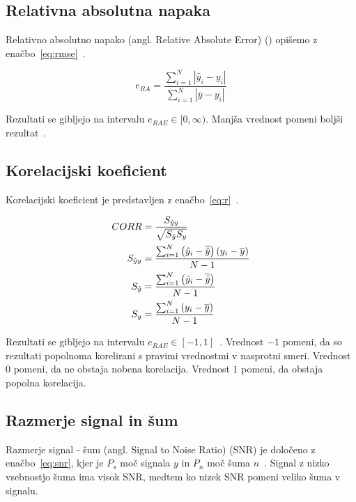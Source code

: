 \subsection{Relativna absolutna napaka}
Relativno absolutno napako (angl. Relative Absolute Error) (\rae) opišemo z enačbo~\eqref{eq:rmse}~\cite{trucco1998introductory}.

\begin{equation}
e_{RA} = \frac{\sum_{i=1}^{N} \left | \hat{y}_i - y_i \right |}{\sum_{i=1}^{N} \left| \overline{y} - y_i \right|}
\label{eq:rae}
\end{equation}

Rezultati se gibljejo na intervalu $e_{RAE} \in [0, \infty)$. Manjša vrednost pomeni boljši rezultat~\cite{witten2005data}.

\subsection{Korelacijski koeficient}
Korelacijski koeficient \corr je predstavljen z enačbo~\eqref{eq:r}~\cite{witten2005data}.

\begin{subequations}
\begin{align}
{CORR} &= \frac{S_{\hat{y}y}}{\sqrt{S_{\hat{y}} S_y}} \\
S_{\hat{y}y} &= \frac{\sum_{i=1}^N \left(\hat{y}_i - \overline{\hat{y}}\right)\left(y_i - \overline{y}\right) }{N-1} \\
S_{\hat{y}} &= \frac{\sum_{i=1}^N \left(\hat{y}_i - \overline{\hat{y}}\right)}{N-1} \\
S_y &= \frac{\sum_{i=1}^N \left(y_i - \overline{y}\right) }{N-1}
\end{align}
\label{eq:r}
\end{subequations}

Rezultati se gibljejo na intervalu $e_{RAE} \in [-1, 1]$~\cite{witten2005data}. Vrednost $-1$ pomeni, da so rezultati popolnoma korelirani s pravimi vrednostmi v nasprotni smeri. Vrednost $0$ pomeni, da ne obstaja nobena korelacija. Vrednost $1$ pomeni, da obstaja popolna korelacija.  


\subsection{Razmerje signal in šum}
Razmerje signal - šum (angl. Signal to Noise Ratio) (SNR) je določeno z enačbo~\eqref{eq:snr}, kjer je $P_s$ moč signala $y$ in $P_n$ moč šuma $n$~\cite{gonzalez2006digital}. Signal z nizko vsebnostjo šuma ima visok SNR, medtem ko nizek SNR pomeni veliko šuma v signalu.

